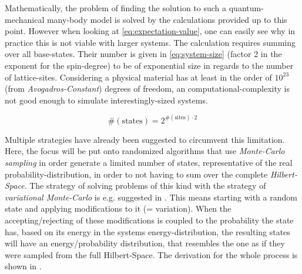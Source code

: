 Mathematically, the problem of finding the solution to such a quantum-mechanical many-body model is solved by the calculations provided up to this point. 
However when looking at \autoref{eq:expectation-value}, one can easily see why in practice this is not viable with larger systems. 
The calculation requires summing over all base-states. 
Their number is given in \autoref{eq:system-size} (factor 2 in the exponent for the spin-degree) to be of exponential size in regards to the number of lattice-sites.
Considering a physical material has at least in the order of $10^{23}$ (from \emph{Avogadros-Constant}) degrees of freedom, an  computational-complexity is not good enough to simulate interestingly-sized systems. 

\begin{equation}
    \label{eq:system-size}
    \text{\#}(\text{states}) = 2^{\text{\#}(\text{sites}) \cdot 2}
\end{equation}

Multiple strategies have already been suggested to circumvent this limitation.
Here, the focus will be put onto randomized algorithms that use \emph{Monte-Carlo sampling} in order generate a limited number of states, representative of the real probability-distribution, in order to not having to sum over the complete \emph{Hilbert-Space}.
The strategy of solving problems of this kind with the strategy of \emph{variational Monte-Carlo} is e.g. suggested in \cite{metropolisAlgorithmAndVariationalMonteCarlo}.
This means starting with a random state and applying modifications to it (= variation).
When the accepting/rejecting of these modifications is coupled to the probability the state has, based on its energy in the systems energy-distribution, the resulting states will have an energy/probability distribution, that resembles the one as if they were sampled from the full Hilbert-Space.
The derivation for the whole process is shown in \cite{monteCarloObservableSampling}.

